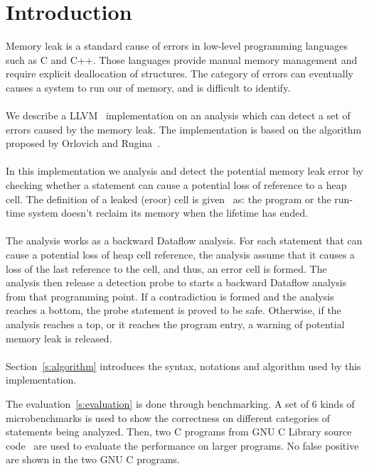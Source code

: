 \section{Introduction}
Memory leak is a standard cause of errors in low-level programming languages
such as C and C++. Those languages provide manual memory management and require
explicit deallocation of structures. The category of errors can eventually
causes a system to run our of memory, and is difficult to identify. \\ \\

We describe a LLVM~\cite{llvm} implementation on an analysis which
can detect a set of errors caused by the memory leak. The implementation is
based on the algorithm proposed by Orlovich and Rugina~\cite{rugina}. \\ \\

In this implementation we analysis and detect the potential memory leak error
by checking whether a statement can cause a potential loss of reference to a 
heap cell. The definition of a leaked (eroor) cell is given~\cite{rugina} as: the 
program or the run-time system doesn't reclaim its memory when the lifetime 
has ended. \\ \\

The analysis works as a backward Dataflow analysis. For each statement that 
can cause a potential loss of heap cell reference, the analysis assume that 
it causes a loss of the last reference to the cell, and thus, an error cell
is formed. The analysis then release a detection probe to starts a backward 
Dataflow analysis from that programming point. If a contradiction is formed 
and the analysis reaches a bottom, the probe statement is proved to be safe. 
Otherwise, if the analysis reaches a top, or it reaches the program entry, 
a warning of potential memory leak is released. \\ \\

Section~\ref{s:algorithm} introduces the syntax, notations and algorithm
used by this implementation. 

The evaluation~\ref{s:evaluation} is done through benchmarking. A set of 6 kinds
of microbenchmarks is used to show the correctness on different categories of
statements being analyzed. Then, two C programs from GNU C Library source
code~\cite{glibc} are used to evaluate the performance on larger programs. No 
false positive are shown in the two GNU C programs.
